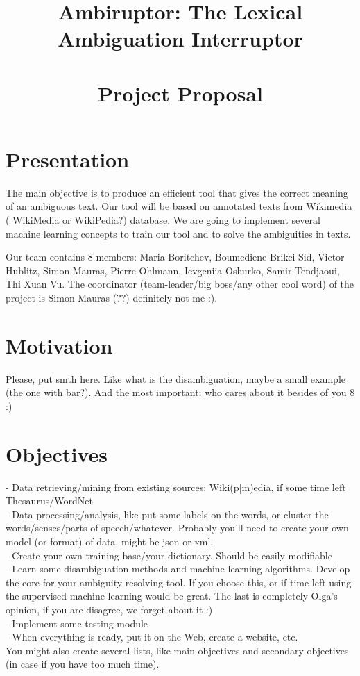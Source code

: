 \documentclass[11pt,a4paper]{article}
\title{\textbf{Ambiruptor: The Lexical Ambiguation
    Interruptor}\\~\\Project Proposal}
\newcommand{\red}[1]{{\color{red} #1}}
\begin{document}
\maketitle

\vspace{1cm}
\section*{Presentation}

The main objective is to produce an efficient tool that gives the correct meaning of an ambiguous text. Our tool will be based on annotated texts from Wikimedia (\red{WikiMedia or WikiPedia?}) database. We are going to implement several machine learning concepts to train our tool and to solve the ambiguities in texts.

Our team contains 8 members: Maria Boritchev, Boumediene Brikci Sid,
Victor Hublitz, Simon Mauras, Pierre Ohlmann, Ievgeniia Oshurko,  Samir
Tendjaoui, Thi Xuan Vu. The coordinator \red{(team-leader/big boss/any other cool word)} of the project is Simon Mauras \red{(??) definitely not me :)}.
\vspace{1cm}
\tableofcontents

\newpage


\section*{Motivation}

\red{Please, put smth here. Like what is the disambiguation, maybe a small example (the one with bar?). And the most important: who cares about it besides of you 8 :)}

\red{
\section{Objectives}
- Data retrieving/mining from existing sources: Wiki(p|m)edia, if some time left Thesaurus/WordNet \\
- Data processing/analysis, like put some labels on the words, or cluster the words/senses/parts of speech/whatever. Probably you'll need to create your own model (or format) of data, might be json or xml.\\
- Create your own training base/your dictionary. Should be easily modifiable\\
- Learn some disambiguation methods and machine learning algorithms. Develop the core for your ambiguity resolving tool. If you choose this, or if time left using the supervised machine learning would be great. The last is completely Olga's opinion, if you are disagree, we forget about it :)\\
- Implement some testing module\\
- When everything is ready, put it on the Web, create a website, etc.\\
You might also create several lists, like main objectives and secondary objectives (in case if you have too much time).
}
\end{document}
